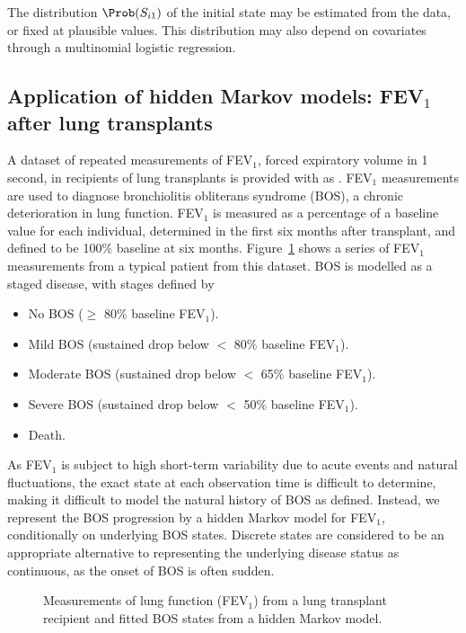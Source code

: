 \documentclass[article,shortnames]{jss}
\begin{document}
The distribution $\Prob(S_{i1})$ of the initial state may be estimated
from the data, or fixed at plausible values.  This distribution may
also depend on covariates through a multinomial logistic regression.


\subsection{Application of hidden Markov models: FEV$_1$ after lung transplants}
\label{sec:fev}

A dataset of repeated measurements of FEV$_1$, forced expiratory
volume in 1 second, in recipients of lung transplants
\citep{JacksonS02} is provided with  as .
FEV$_1$ measurements are used to diagnose bronchiolitis obliterans
syndrome (BOS), a chronic deterioration in lung function.  FEV$_1$ is
measured as a percentage of a baseline value for each individual,
determined in the first six months after transplant, and defined to be
100\% baseline at six months.  Figure~\ref{fig:fev} shows a series of
FEV$_1$ measurements from a typical patient from this dataset.  BOS is
modelled as a staged disease, with stages defined by
\begin{itemize}
\item No BOS ($\geq$ 80\% baseline FEV$_1$).
\item Mild BOS (sustained drop below $<$ 80\% baseline FEV$_1$).
\item Moderate BOS (sustained drop below $<$ 65\% baseline FEV$_1$).
\item Severe BOS (sustained drop below $<$ 50\% baseline FEV$_1$).
\item Death.
\end{itemize}
As FEV$_1$ is subject to high short-term variability due to acute
events and natural fluctuations, the exact state at each observation
time is difficult to determine, making it difficult to model the
natural history of BOS as defined.  Instead, we represent the BOS
progression by a hidden Markov model for FEV$_1$, conditionally on
underlying BOS states.  Discrete states are considered to be an
appropriate alternative to representing the underlying disease status
as continuous, as the onset of BOS is often sudden.

\begin{figure}[t!]
  \centering
  \caption{Measurements of lung function (FEV$_1$) from a lung transplant recipient and fitted BOS states from a hidden Markov model.\label{fig:fev}}
\end{figure}
\end{document}
